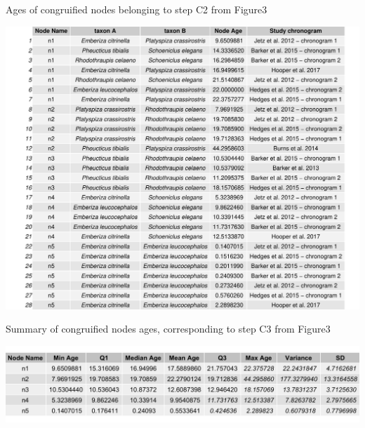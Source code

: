 \begin{table}
  \caption{Ages of congruified nodes belonging to step C2 from Figure3}
  \label{tbl:table1}
  \includegraphics[width=\linewidth]{../tables/table-fringillidae-small-example.pdf}
\end{table}


\begin{table}
  \caption{Summary of congruified nodes ages, corresponding to step C3 from Figure3}
  \label{tbl:table2}
  \includegraphics[width=\linewidth]{../tables/table-fringillidae-small-example-summary.png}
\end{table}
